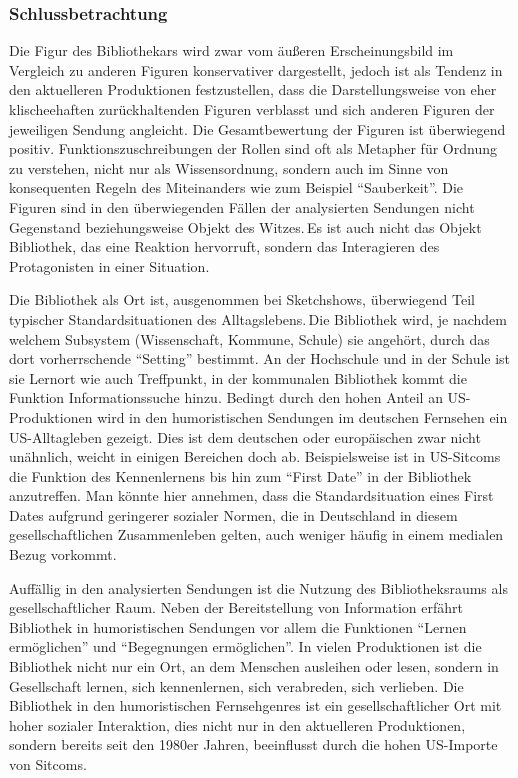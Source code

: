 \subsubsection{Schlussbetrachtung}\label{schlussbetrachtung}

Die Figur des Bibliothekars wird zwar vom äußeren Erscheinungsbild im
Vergleich zu anderen Figuren konservativer dargestellt, jedoch ist als
Tendenz in den aktuelleren Produktionen festzustellen, dass die
Darstellungsweise von eher klischeehaften zurückhaltenden Figuren
verblasst und sich anderen Figuren der jeweiligen Sendung angleicht. Die
Gesamtbewertung der Figuren ist überwiegend positiv.
Funktionszuschreibungen der Rollen sind oft als Metapher für Ordnung zu
verstehen, nicht nur als Wissensordnung, sondern auch im Sinne von
konsequenten Regeln des Miteinanders wie zum Beispiel
\enquote{Sauberkeit}. Die Figuren sind in den überwiegenden Fällen der
analysierten Sendungen nicht Gegenstand beziehungsweise Objekt des
Witzes.\,Es ist auch nicht das Objekt Bibliothek, das eine Reaktion
hervorruft, sondern das Interagieren des Protagonisten in einer
Situation.

Die Bibliothek als Ort ist, ausgenommen bei Sketchshows, überwiegend
Teil typischer Standardsituationen des Alltagslebens.\,Die Bibliothek
wird, je nachdem welchem Subsystem (Wissenschaft, Kommune, Schule) sie
angehört, durch das dort vorherrschende \enquote{Setting} bestimmt. An
der Hochschule und in der Schule ist sie Lernort wie auch Treffpunkt, in
der kommunalen Bibliothek kommt die Funktion Informationssuche hinzu.
Bedingt durch den hohen Anteil an US-Produktionen wird in den
humoristischen Sendungen im deutschen Fernsehen ein US-Alltagleben
gezeigt. Dies ist dem deutschen oder europäischen zwar nicht unähnlich,
weicht in einigen Bereichen doch ab. Beispielsweise ist in US-Sitcoms
die Funktion des Kennenlernens bis hin zum \enquote{First Date} in der
Bibliothek anzutreffen. Man könnte hier annehmen, dass die
Standardsituation eines First Dates aufgrund geringerer
sozialer Normen, die in Deutschland in diesem gesellschaftlichen
Zusammenleben gelten, auch weniger häufig in einem medialen Bezug
vorkommt.

Auffällig in den analysierten Sendungen ist die Nutzung des
Bibliotheksraums als gesellschaftlicher Raum. Neben der Bereitstellung
von Information erfährt Bibliothek in humoristischen Sendungen vor allem
die Funktionen \enquote{Lernen ermöglichen} und \enquote{Begegnungen
ermöglichen}. In vielen Produktionen ist die Bibliothek nicht nur ein
Ort, an dem Menschen ausleihen oder lesen, sondern in Gesellschaft
lernen, sich kennenlernen, sich verabreden, sich verlieben. Die
Bibliothek in den humoristischen Fernsehgenres ist ein
gesellschaftlicher Ort mit hoher sozialer Interaktion, dies nicht nur in
den aktuelleren Produktionen, sondern bereits seit den 1980er Jahren,
beeinflusst durch die hohen US-Importe von Sitcoms.

